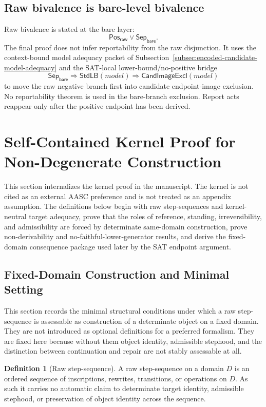 \documentclass[11pt]{article}
\theoremstyle{definition}
\newtheorem{definition}[theorem]{Definition}
\theoremstyle{remark}
\newcommand{\PosRaw}{\mathsf{Pos}_{\mathsf{raw}}}
\newcommand{\SepBare}{\mathsf{Sep}_{\mathsf{bare}}}
\newcommand{\StdLB}{\mathsf{StdLB}}
\newcommand{\CandImageExcl}{\mathsf{CandImageExcl}}
\begin{document}
\subsection{Raw bivalence is bare-level bivalence}
Raw bivalence is stated at the bare layer:
\[
  \PosRaw\vee\SepBare.
\]
The final proof does not infer reportability from the raw disjunction. It uses the context-bound model adequacy packet of Subsection~\ref{subsec:encoded-candidate-model-adequacy} and the SAT-local lower-bound/no-positive bridge
\[
  \SepBare\Rightarrow\StdLB(model)\Rightarrow\CandImageExcl(model)
\]
to move the raw negative branch first into candidate endpoint-image exclusion. No reportability theorem is used in the bare-branch exclusion. Report acts reappear only after the positive endpoint has been derived.


\section{Self-Contained Kernel Proof for Non-Degenerate Construction}\label{sec:self-contained-kernel}

This section internalizes the kernel proof in the manuscript. The kernel is not cited as an external AASC preference and is not treated as an appendix assumption. The definitions below begin with raw step-sequences and kernel-neutral target adequacy, prove that the roles of reference, standing, irreversibility, and admissibility are forced by determinate same-domain construction, prove non-derivability and no-faithful-lower-generator results, and derive the fixed-domain consequence package used later by the SAT endpoint argument.

\subsection{Fixed-Domain Construction and Minimal Setting}

This section records the minimal structural conditions under which a raw step-sequence is assessable as construction of a determinate object on a fixed domain. They are not introduced as optional definitions for a preferred formalism. They are fixed here because without them object identity, admissible stephood, and the distinction between continuation and repair are not stably assessable at all.

\begin{definition}[Raw step-sequence]\label{def:raw-step-sequence}
A raw step-sequence on a domain $D$ is an ordered sequence of inscriptions, rewrites, transitions, or operations on $D$. As such it carries no automatic claim to determinate target identity, admissible stephood, or preservation of object identity across the sequence.
\end{definition}
\end{document}
